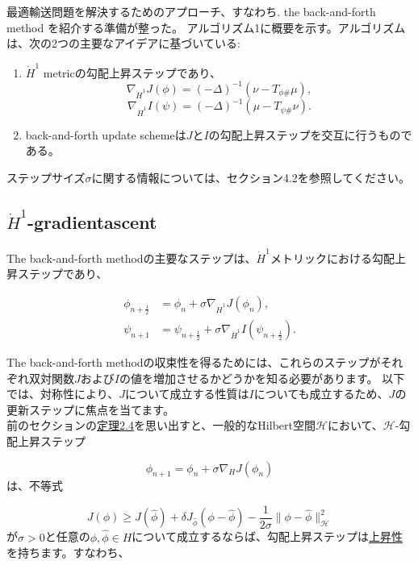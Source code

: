 \documentclass{jsarticle}
\theoremstyle{definition}
\begin{document}
最適輸送問題を解決するためのアプローチ、すなわち. the back-and-forth method を紹介する準備が整った。
アルゴリズム1に概要を示す。アルゴリズムは、次の2つの主要なアイデアに基づいている:

\begin{enumerate}
  \item $\dot{H}^1$ metricの勾配上昇ステップであり、
        $$
        \nabla_{\dot{H}^1} J(\phi) = (- \Delta)^{-1} (\nu - T_{\phi \#} \mu),
        $$
        \begin{equation}
          \nabla_{\dot{H}^1} I(\psi) = (- \Delta)^{-1} (\mu - T_{\psi \#} \nu).
        \end{equation}
  
  \item back-and-forth update schemeは$J$と$I$の勾配上昇ステップを交互に行うものである。
\end{enumerate}

ステップサイズ$\sigma$に関する情報については、セクション4.2を参照してください。


\subsection{$\dot{H}^1$-gradientascent}
\label{sect:H1-gradient ascent}
The back-and-forth methodの主要なステップは、$\dot{H}^1$メトリックにおける勾配上昇ステップであり、

\begin{align*}
\phi_{n + \frac{1}{2}} &= \phi_n + \sigma \nabla_{\dot{H}^1} J(\phi_n), \\
\psi_{n + 1} &= \psi_{n + \frac{1}{2}} + \sigma \nabla_{\dot{H}^1} I(\psi_{n + \frac{1}{2}}).
\end{align*}

The back-and-forth methodの収束性を得るためには、これらのステップがそれぞれ双対関数$J$および$I$の値を増加させるかどうかを知る必要があります。
以下では、対称性により、$J$について成立する性質は$I$についても成立するため、$J$の更新ステップに焦点を当てます。\\



前のセクションの\hyperlink{定理2.4}{定理2.4}を思い出すと、一般的なHilbert空間$\mathcal{H} $において、$\mathcal{H}$-勾配上昇ステップ

$$\phi_{n+1}=\phi_n+\sigma\nabla_H J(\phi_n)$$
は、不等式

\begin{equation}
  J(\phi)\geq J(\hat{\phi})+\delta J _{\hat{\phi}}(\phi-\hat{\phi})-\frac{1}{2\sigma}\|\phi-\hat{\phi}\|_{\mathcal{H}}^2
\end{equation}
が$\sigma>0$と任意の$\phi,\hat{\phi}\in H$について成立するならば、勾配上昇ステップは\hyperlink{上昇性}{上昇性}を持ちます。すなわち、
\end{document}
